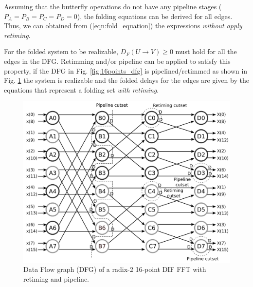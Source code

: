\documentclass[journal,comsoc]{IEEEtran}
\begin{document}
Assuming that the butterfly operations do not have any pipeline stages ($P_A=P_B=P_C=P_D=0$), the folding equations can be derived for all edges. Thus, we can obtained from (\ref{eqn:fold_equation}) the expressions \textit{without apply retiming}.
\begin{small}

\end{small}
For the folded system to be realizable, $D_F(U\to V)\geq0$ must hold for all the edges in the DFG. Retimming and/or pipeline can be applied to satisfy this property, if the DFG in Fig. \ref{fig:16points_dfg} is pipelined/retimmed as shown in Fig. \ref{fig:dfg_16_ret} the system is realizable and the folded delays for the edges are given by the equations that represent a folding set \textit{with retiming}.

\begin{figure} 
\centering
\includegraphics[width=\linewidth]{Diagramas/16points_dfg_ret.png}
\caption{Data Flow graph (DFG) of a radix-2 16-point DIF FFT with retiming and pipeline.}
\label{fig:dfg_16_ret}
\end{figure}
\begin{small}

\end{small}
\end{document}
